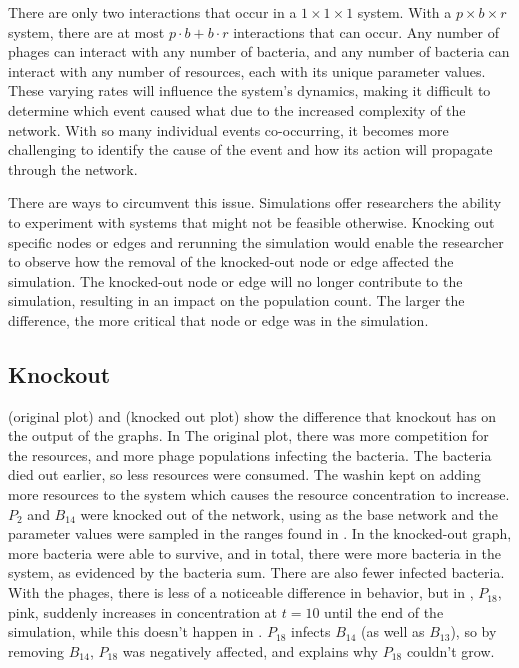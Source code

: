 There are only two interactions that occur in a $1\times1\times1$ system. 
With a $p\times b\times r$ system, there are at most $p\cdot b + b\cdot r$ interactions that can occur. 
Any number of phages can interact with any number of bacteria, and any number of bacteria can interact with any number of resources, each with its unique parameter values. 
These varying rates will influence the system's dynamics, making it difficult to determine which event caused what due to the increased complexity of the network. 
With so many individual events co-occurring, it becomes more challenging to identify the cause of the event and how its action will propagate through the network. 

There are ways to circumvent this issue. 
Simulations offer researchers the ability to experiment with systems that might not be feasible otherwise. 
Knocking out specific nodes or edges and rerunning the simulation would enable the researcher to observe how the removal of the knocked-out node or edge affected the simulation. 
The knocked-out node or edge will no longer contribute to the simulation, resulting in an impact on the population count. 
The larger the difference, the more critical that node or edge was in the simulation. 

\subsection{Knockout}
 (original plot) and  (knocked out plot) show the difference that knockout has on the output of the graphs. 
In The original plot, there was more competition for the resources, and more phage populations infecting the bacteria. 
The bacteria died out earlier, so less resources were consumed. 
The washin kept on adding more resources to the system which causes the resource concentration to increase. 
$P_2$ and $B_{14}$ were knocked out of the network, using  as the base network and the parameter values were sampled in the ranges found in . 
In the knocked-out graph, more bacteria were able to survive, and in total, there were more bacteria in the system, as evidenced by the bacteria sum. 
There are also fewer infected bacteria. 
With the phages, there is less of a noticeable difference in behavior, but in , $P_{18}$, pink, suddenly increases in concentration at $t=10$ until the end of the simulation, while this doesn't happen in . 
$P_{18}$ infects $B_{14}$ (as well as $B_13$), so by removing $B_{14}$, $P_{18}$ was negatively affected, and explains why $P_{18}$ couldn't grow. 

